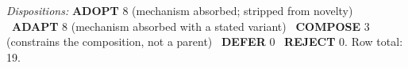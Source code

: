 \par\medskip
\noindent\textit{Dispositions:} \textbf{ADOPT} 8 (mechanism absorbed; stripped from novelty) \textperiodcentered\ \textbf{ADAPT} 8 (mechanism absorbed with a stated variant) \textperiodcentered\ \textbf{COMPOSE} 3 (constrains the composition, not a parent) \textperiodcentered\ \textbf{DEFER} 0 \textperiodcentered\ \textbf{REJECT} 0. Row total: 19.